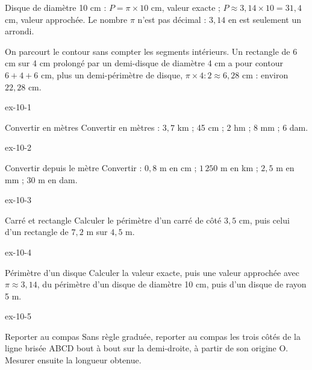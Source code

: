 \begin{exemple}Disque de diamètre 10 cm : $P=\pi\times10$ cm, valeur exacte ; $P\approx3{,}14\times10=31{,}4$ cm, valeur approchée. Le nombre $\pi$ n’est pas décimal : $3{,}14$ en est seulement un arrondi.\end{exemple}
\begin{savoirfaire}On parcourt le contour sans compter les segments intérieurs. Un rectangle de 6 cm sur 4 cm prolongé par un demi-disque de diamètre 4 cm a pour contour $6+4+6$ cm, plus un demi-périmètre de disque, $\pi\times4:2\approx6{,}28$ cm : environ $22{,}28$ cm.\end{savoirfaire}

\clearpage{}
\begin{blocLivre}{ex-10-1}\begin{exercice}[1]{Convertir en mètres}
Convertir en mètres : $3{,}7$ km ; 45 cm ; 2 hm ; 8 mm ; 6 dam.
\end{exercice}\end{blocLivre}
\begin{blocLivre}{ex-10-2}\begin{exercice}[1]{Convertir depuis le mètre}
Convertir : $0{,}8$ m en cm ; $1\,250$ m en km ; $2{,}5$ m en mm ; 30 m en dam.
\end{exercice}\end{blocLivre}
\begin{blocLivre}{ex-10-3}\begin{exercice}[1]{Carré et rectangle}
Calculer le périmètre d’un carré de côté $3{,}5$ cm, puis celui d’un rectangle de $7{,}2$ m sur $4{,}5$ m.
\end{exercice}\end{blocLivre}
\begin{blocLivre}{ex-10-4}\begin{exercice}[1]{Périmètre d’un disque}
Calculer la valeur exacte, puis une valeur approchée avec $\pi\approx3{,}14$, du périmètre d’un disque de diamètre 10 cm, puis d’un disque de rayon 5 m.
\end{exercice}\end{blocLivre}
\begin{blocLivre}{ex-10-5}\begin{exercice}[1]{Reporter au compas}
Sans règle graduée, reporter au compas les trois côtés de la ligne brisée ABCD bout à bout sur la demi-droite, à partir de son origine O. Mesurer ensuite la longueur obtenue.
\label{fig-ex-10-5}
\end{exercice}\end{blocLivre}

